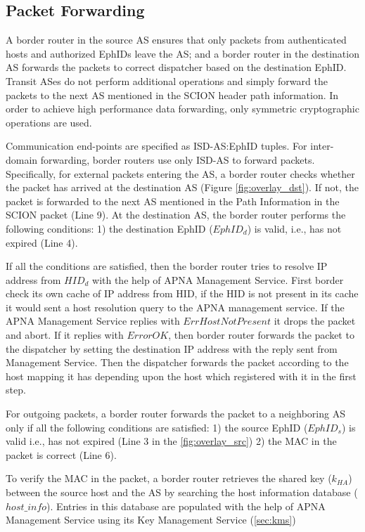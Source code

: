 \subsection{Packet Forwarding}
A border router in the source AS ensures that only packets from authenticated hosts and authorized EphIDs leave the AS; and a border router in the destination AS forwards the packets to correct dispatcher based on the destination EphID. Transit ASes do not perform additional operations and simply forward the packets to the next AS mentioned in the SCION header path information. In order to achieve high performance data forwarding, only symmetric cryptographic operations are used.

Communication end-points are specified as ISD-AS:EphID tuples. For inter-domain forwarding, border routers use only ISD-AS to forward packets. Specifically, for external packets entering the AS, a border router checks whether the packet has arrived at the destination AS (Figure \ref{fig:overlay_dst}). If not, the packet is forwarded to the next AS mentioned in the Path Information in the SCION packet (Line 9). At the destination AS, the border router performs the following conditions: 1) the destination EphID ($EphID_{d}$) is valid, i.e., has not expired (Line 4).

If all the conditions are satisfied, then the border router tries to resolve IP address from $HID_{d}$ with the help of APNA Management Service. First border check its own cache of IP address from HID, if the HID is not present in its cache it would sent a host resolution query to the APNA management service. If the APNA Management Service replies with $ErrHostNotPresent$ it drops the packet and abort. If it replies with $ErrorOK$, then border router forwards the packet to the dispatcher by setting the destination IP address with the reply sent from Management Service. Then the dispatcher forwards the packet according to the host mapping it has depending upon the host which registered with it in the first step.

For outgoing packets, a border router forwards the packet to a neighboring AS only if all the following conditions are satisfied: 1) the source EphID ($EphID_{s}$) is valid i.e., has not expired (Line 3 in the \ref{fig:overlay_src}) 2) the MAC in the packet is correct (Line 6).

To verify the MAC in the packet, a border router retrieves the shared key ($k_{HA}$) between the source host and the AS by searching the host information database ($host\_info$). Entries in this database are populated with the help of APNA Management Service using its Key Management Service (\ref{sec:kms})

